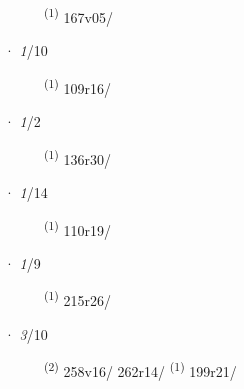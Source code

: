 \begin{description}
    \item[]  \textsuperscript{(1)} \mbox{167v05/}
\end{description}
\ENTRYEND
\noindent{} · \textit{1}/10 \LEMMALINE
\begin{description}
    \item[]  \textsuperscript{(1)} \mbox{109r16/}
\end{description}
\ENTRYEND
\noindent{} · \textit{1}/2 \LEMMALINE
\begin{description}
    \item[]  \textsuperscript{(1)} \mbox{136r30/}
\end{description}
\ENTRYEND
\noindent{} · \textit{1}/14 \LEMMALINE
\begin{description}
    \item[]  \textsuperscript{(1)} \mbox{110r19/}
\end{description}
\ENTRYEND
\noindent{} · \textit{1}/9 \LEMMALINE
\begin{description}
    \item[]  \textsuperscript{(1)} \mbox{215r26/}
\end{description}
\ENTRYEND
\noindent{} · \textit{3}/10 \LEMMALINE
\begin{description}
    \item[]  \textsuperscript{(2)} \mbox{258v16/} \mbox{262r14/} \CASEBREAK {} \textsuperscript{(1)} \mbox{199r21/}
\end{description}
\ENTRYEND

